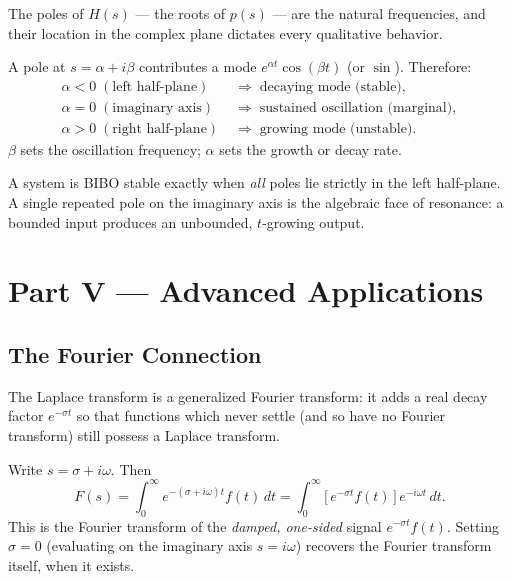 The poles of $H(s)$ --- the roots of $p(s)$ --- are the natural frequencies, and
their location in the complex plane dictates every qualitative behavior.

\begin{formulabox}
A pole at $s = \alpha + i\beta$ contributes a mode $e^{\alpha t}\cos(\beta t)$ (or
$\sin$). Therefore:
\[
\begin{aligned}
\alpha < 0 \;(\text{left half-plane}) &\;\Rightarrow\; \text{decaying mode (stable)},\\
\alpha = 0 \;(\text{imaginary axis}) &\;\Rightarrow\; \text{sustained oscillation (marginal)},\\
\alpha > 0 \;(\text{right half-plane}) &\;\Rightarrow\; \text{growing mode (unstable)}.
\end{aligned}
\]
$\beta$ sets the oscillation frequency; $\alpha$ sets the growth or decay rate.
\end{formulabox}

\begin{conceptbox}
A system is \textcolor{accentorange}{BIBO stable} exactly when \emph{all} poles lie
strictly in the left half-plane. A single repeated pole on the imaginary axis is the
algebraic face of \textcolor{accentorange}{resonance}: a bounded input produces an
unbounded, $t$-growing output.
\end{conceptbox}

\clearpage
{}
{}
\section*{Part V --- Advanced Applications}

\subsection{The Fourier Connection}

The Laplace transform is a generalized Fourier transform: it adds a real decay
factor $e^{-\sigma t}$ so that functions which never settle (and so have no Fourier
transform) still possess a Laplace transform.

\begin{formulabox}
Write $s = \sigma + i\omega$. Then
\[ F(s) = \int_0^\infty e^{-(\sigma + i\omega)t} f(t)\,dt
   = \int_0^\infty \big[\,e^{-\sigma t} f(t)\,\big]\,e^{-i\omega t}\,dt. \]
This is the Fourier transform of the \emph{damped, one-sided} signal
$e^{-\sigma t}f(t)$. Setting $\sigma=0$ (evaluating on the imaginary axis $s=i\omega$)
recovers the Fourier transform itself, when it exists.
\end{formulabox}

